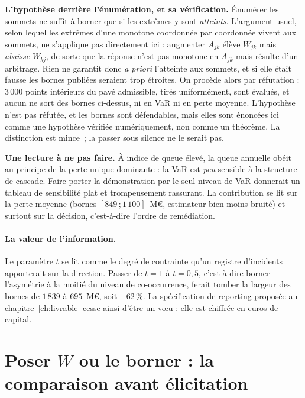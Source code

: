 \begin{attention}
\textbf{L'hypothèse derrière l'énumération, et sa vérification.} Énumérer les sommets ne suffit
à borner que si les extrêmes y sont \emph{atteints}. L'argument usuel, selon lequel les extrêmes d'une monotone coordonnée par coordonnée vivent aux sommets, ne s'applique pas
directement ici : augmenter $A_{jk}$ élève $W_{jk}$ mais \emph{abaisse} $W_{kj}$, de sorte que
la réponse n'est pas monotone en $A_{jk}$ mais résulte d'un arbitrage. Rien ne garantit donc
\emph{a priori} l'atteinte aux sommets, et si elle était fausse les bornes publiées seraient trop
étroites. On procède alors par réfutation : $3\,000$ points intérieurs du pavé
admissible, tirés uniformément, sont évalués, et aucun ne sort des bornes ci-dessus, ni
en VaR ni en perte moyenne. L'hypothèse n'est pas réfutée, et les bornes sont défendables, mais
elles sont énoncées ici comme une hypothèse vérifiée numériquement, non comme un
théorème. La distinction est mince~; la passer sous silence ne le serait pas.
\end{attention}

\begin{attention}
\textbf{Une lecture à ne pas faire.} À indice de queue élevé, la queue annuelle obéit au
principe de la perte unique dominante : la VaR est \emph{peu} sensible à la structure de
cascade. Faire porter la démonstration par le seul niveau de VaR donnerait un tableau de
sensibilité plat et trompeusement rassurant. La contribution se lit sur la perte
moyenne (bornes $[849\,;1\,100]$~M\euro{}, estimateur bien moins bruité) et surtout sur
la décision, c'est-à-dire l'ordre de remédiation.
\end{attention}

\paragraph{La valeur de l'information.} Le paramètre $t$ se lit comme le degré de
contrainte qu'un registre d'incidents apporterait sur la direction. Passer de $t=1$ à
$t=0{,}5$, c'est-à-dire borner l'asymétrie à la moitié du niveau de co-occurrence, ferait
tomber la largeur des bornes de $1\,839$ à $695$~M\euro{}, soit $-62\,\%$. La
spécification de reporting proposée au chapitre~\ref{ch:livrable} cesse ainsi
d'être un v\oe{}u : elle est chiffrée en euros de capital.


\section{Poser \texorpdfstring{$W$}{W} ou le borner : la comparaison avant élicitation}

